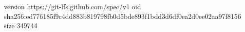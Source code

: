 version https://git-lfs.github.com/spec/v1
oid sha256:ed776185f9c4dd883b819798fb0d5bde893f1bdd3d6df0ea2d0ee02aa97f8156
size 349744
